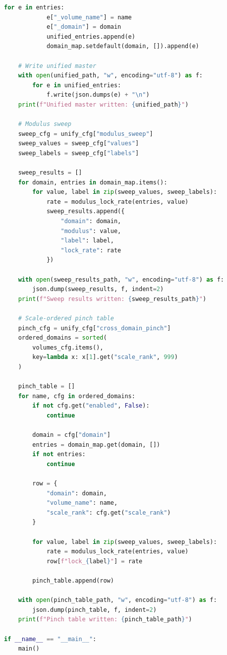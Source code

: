 \documentclass[11pt, letterpaper, openany]{book}
\begin{document}
\begin{lstlisting}[language=Python]
        for e in entries:
            e["_volume_name"] = name
            e["_domain"] = domain
            unified_entries.append(e)
            domain_map.setdefault(domain, []).append(e)

    # Write unified master
    with open(unified_path, "w", encoding="utf-8") as f:
        for e in unified_entries:
            f.write(json.dumps(e) + "\n")
    print(f"Unified master written: {unified_path}")

    # Modulus sweep
    sweep_cfg = unify_cfg["modulus_sweep"]
    sweep_values = sweep_cfg["values"]
    sweep_labels = sweep_cfg["labels"]

    sweep_results = []
    for domain, entries in domain_map.items():
        for value, label in zip(sweep_values, sweep_labels):
            rate = modulus_lock_rate(entries, value)
            sweep_results.append({
                "domain": domain,
                "modulus": value,
                "label": label,
                "lock_rate": rate
            })

    with open(sweep_results_path, "w", encoding="utf-8") as f:
        json.dump(sweep_results, f, indent=2)
    print(f"Sweep results written: {sweep_results_path}")

    # Scale-ordered pinch table
    pinch_cfg = unify_cfg["cross_domain_pinch"]
    ordered_domains = sorted(
        volumes_cfg.items(),
        key=lambda x: x[1].get("scale_rank", 999)
    )

    pinch_table = []
    for name, cfg in ordered_domains:
        if not cfg.get("enabled", False):
            continue

        domain = cfg["domain"]
        entries = domain_map.get(domain, [])
        if not entries:
            continue

        row = {
            "domain": domain,
            "volume_name": name,
            "scale_rank": cfg.get("scale_rank")
        }

        for value, label in zip(sweep_values, sweep_labels):
            rate = modulus_lock_rate(entries, value)
            row[f"lock_{label}"] = rate

        pinch_table.append(row)

    with open(pinch_table_path, "w", encoding="utf-8") as f:
        json.dump(pinch_table, f, indent=2)
    print(f"Pinch table written: {pinch_table_path}")

if __name__ == "__main__":
    main()
\end{lstlisting}
\end{document}

